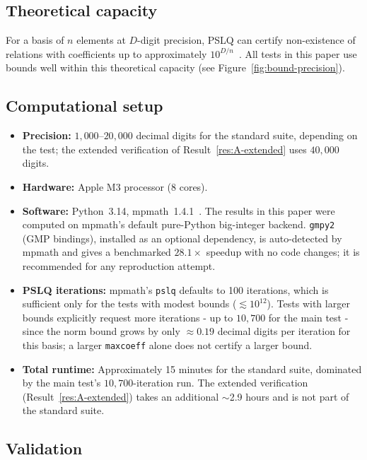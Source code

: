\documentclass[12pt]{article}
\theoremstyle{definition}
\theoremstyle{remark}
\begin{document}
\subsection{Theoretical capacity}\label{sec:capacity}

For a basis of $n$ elements at $D$-digit precision, PSLQ can
certify non-existence of relations with coefficients up to
approximately $10^{D/n}$~\cite{FergusonBaileyArwade1999}.  All tests
in this paper use bounds well within this theoretical capacity
(see Figure~\ref{fig:bound-precision}).

\subsection{Computational setup}\label{sec:setup}

\begin{itemize}
  \item \textbf{Precision:} $1{,}000$--$20{,}000$ decimal digits
    for the standard suite, depending on the test; the extended
    verification of Result~\ref{res:A-extended} uses $40{,}000$
    digits.
  \item \textbf{Hardware:} Apple M3 processor (8 cores).
  \item \textbf{Software:} Python~3.14, mpmath~1.4.1~\cite{mpmath}.
    The results in this paper were computed on mpmath's default
    pure-Python big-integer backend.  \texttt{gmpy2} (GMP bindings),
    installed as an optional dependency, is auto-detected by mpmath
    and gives a benchmarked $28.1\times$ speedup with no code changes;
    it is recommended for any reproduction attempt.
  \item \textbf{PSLQ iterations:} mpmath's \texttt{pslq} defaults to
    100 iterations, which is sufficient only for the tests with
    modest bounds ($\lesssim 10^{12}$).  Tests with larger bounds
    explicitly request more iterations - up to $10{,}700$ for the
    main test - since the norm bound grows by only
    $\approx 0.19$ decimal digits per iteration for this basis; a
    larger \texttt{maxcoeff} alone does not certify a larger bound.
  \item \textbf{Total runtime:} Approximately 15 minutes for the
    standard suite, dominated by the main test's $10{,}700$-iteration
    run.  The extended verification (Result~\ref{res:A-extended})
    takes an additional $\sim$2.9 hours and is not part of the
    standard suite.
\end{itemize}


\subsection{Validation}\label{sec:validation}
\end{document}
